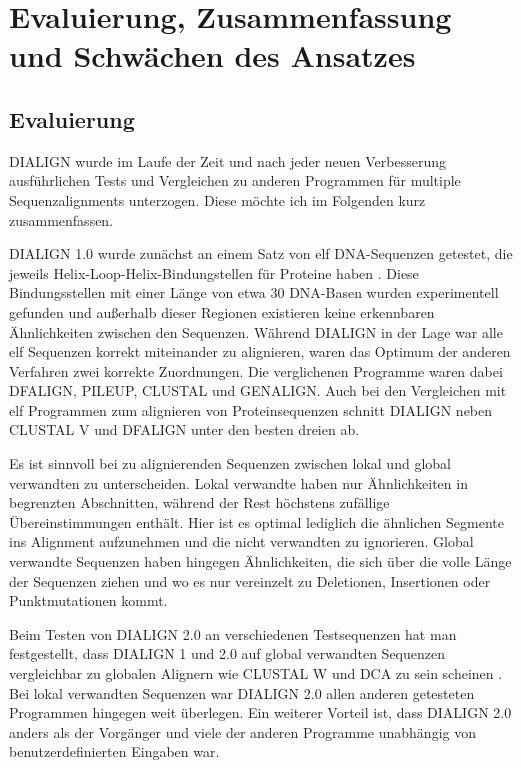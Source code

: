 \section{Evaluierung, Zusammenfassung und Schwächen des Ansatzes}

\subsection{Evaluierung}

DIALIGN	wurde im Laufe der Zeit und nach jeder neuen Verbesserung ausführlichen Tests und Vergleichen zu anderen Programmen für multiple Sequenzalignments unterzogen. Diese möchte ich im Folgenden kurz zusammenfassen.

DIALIGN 1.0 wurde zunächst an einem Satz von elf DNA-Sequenzen getestet, die jeweils Helix-Loop-Helix-Bindungstellen für Proteine haben \citep{mdw96}. Diese Bindungsstellen mit einer Länge von etwa 30 DNA-Basen wurden experimentell gefunden und außerhalb dieser Regionen existieren keine erkennbaren Ähnlichkeiten zwischen den Sequenzen. Während DIALIGN in der Lage war alle elf Sequenzen korrekt miteinander zu alignieren, waren das Optimum der anderen Verfahren zwei korrekte Zuordnungen. Die verglichenen Programme waren dabei DFALIGN, PILEUP, CLUSTAL und GENALIGN. Auch bei den Vergleichen mit elf Programmen zum alignieren von Proteinsequenzen schnitt DIALIGN neben CLUSTAL V und DFALIGN unter den besten dreien ab.

Es ist sinnvoll bei zu alignierenden Sequenzen zwischen lokal und global verwandten zu unterscheiden. Lokal verwandte haben nur Ähnlichkeiten in begrenzten Abschnitten, während der Rest höchstens zufällige Übereinstimmungen enthält. Hier ist es optimal lediglich die ähnlichen Segmente ins Alignment aufzunehmen und die nicht verwandten zu ignorieren. Global verwandte Sequenzen haben hingegen Ähnlichkeiten, die sich über die volle Länge der Sequenzen ziehen und wo es nur vereinzelt zu Deletionen, Insertionen oder Punktmutationen kommt.

Beim Testen von DIALIGN 2.0 an verschiedenen Testsequenzen hat man festgestellt, dass DIALIGN 1 und 2.0 auf global verwandten Sequenzen vergleichbar zu globalen Alignern wie CLUSTAL W und DCA zu sein scheinen \citep{mahd98}. Bei lokal verwandten Sequenzen war DIALIGN 2.0 allen anderen getesteten Programmen hingegen weit überlegen. Ein weiterer Vorteil ist, dass DIALIGN 2.0 anders als der Vorgänger und viele der anderen Programme unabhängig von benutzerdefinierten Eingaben war.

